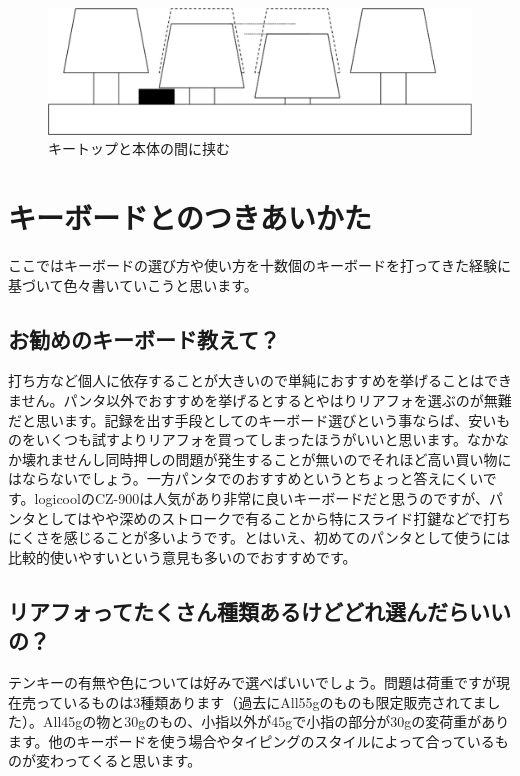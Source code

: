 \begin{figure}
 \begin{center}
   \includegraphics[width=14cm,clip]{res_eigh/img9.eps}
 \end{center}
 \caption{キートップと本体の間に挟む}
 \label{eigh:img9}
\end{figure}


\section{キーボードとのつきあいかた}
ここではキーボードの選び方や使い方を十数個のキーボードを打ってきた経験に基づいて色々書いていこうと思います。

\subsection{お勧めのキーボード教えて？}
打ち方など個人に依存することが大きいので単純におすすめを挙げることはできません。パンタ以外でおすすめを挙げるとするとやはりリアフォを選ぶのが無難だと思います。記録を出す手段としてのキーボード選びという事ならば、安いものをいくつも試すよりリアフォを買ってしまったほうがいいと思います。なかなか壊れませんし同時押しの問題が発生することが無いのでそれほど高い買い物にはならないでしょう。一方パンタでのおすすめというとちょっと答えにくいです。logicoolのCZ-900は人気があり非常に良いキーボードだと思うのですが、パンタとしてはやや深めのストロークで有ることから特にスライド打鍵などで打ちにくさを感じることが多いようです。とはいえ、初めてのパンタとして使うには比較的使いやすいという意見も多いのでおすすめです。


\subsection{リアフォってたくさん種類あるけどどれ選んだらいいの？}
テンキーの有無や色については好みで選べばいいでしょう。問題は荷重ですが現在売っているものは3種類あります（過去にAll55gのものも限定販売されてました）。All45gの物と30gのもの、小指以外が45gで小指の部分が30gの変荷重があります。他のキーボードを使う場合やタイピングのスタイルによって合っているものが変わってくると思います。

